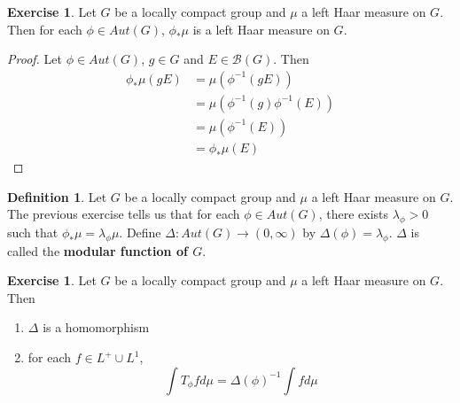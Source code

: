 \documentclass[12pt]{amsart}
\theoremstyle{definition}
\newtheorem{defn}[definition]{Definition}
\newtheorem{ex}[definition]{Exercise}
\newcommand{\Del}{\Delta}
\newcommand{\lam}{\lambda}
\newcommand{\MB}{\mathcal{B}}
\begin{document}
	\begin{ex}
		Let $G$ be a locally compact group and $\mu$ a left Haar measure on $G$. Then for each $\phi \in Aut(G)$, $\phi_*\mu$ is a left Haar measure on $G$.
	\end{ex}

	\begin{proof}
		Let $\phi \in Aut(G)$, $g \in G$ and $E \in \MB(G)$. Then 
		\begin{align*}
			\phi_* \mu(g E) 
			& = \mu (\phi^{-1}(gE)) \\ 
			& = \mu (\phi^{-1}(g) \phi^{-1}(E)) \\
			& = \mu(\phi^{-1}(E)) \\ 
			& = \phi_* \mu(E)
		\end{align*}
	\end{proof}

	\begin{defn}
		Let $G$ be a locally compact group and $\mu$ a left Haar measure on $G$. The previous exercise tells us that for each $\phi \in Aut(G)$, there exists $\lam_{\phi} > 0 $ such that $\phi_* \mu = \lam_{\phi} \mu$. Define $\Del : Aut(G) \rightarrow (0, \infty)$ by $\Del(\phi) = \lam_{\phi}$. $\Del$ is called the \textbf{modular function of $G$}.
	\end{defn}

	\begin{ex}
		Let $G$ be a locally compact group and $\mu$ a left Haar measure on $G$. Then 
		\begin{enumerate}
			\item $\Del$ is a homomorphism
			\item for each $f \in L^+ \cup L^1$, $$\int T_{\phi} f d \mu = \Del(\phi)^{-1} \int f d \mu$$
		\end{enumerate}	
	\end{ex}
\end{document}
